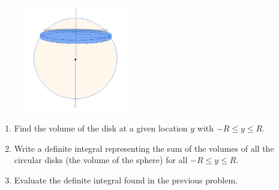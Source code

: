 \documentclass[12pt,letterpaper,fleqn]{article}
\begin{document}
\begin{enumerate}
\begin{figure}[!htb]
        \includegraphics[width=0.4\textwidth]{img/sphere_vol_by_disks.png}
       \end{figure}
       \begin{enumerate}
        \item Find the volume of the disk at a given location $y$ with $-R \leq y \leq R$.
        \item Write a definite integral representing the sum of the volumes of all the circular disks (the volume of the sphere) for all $-R \leq y \leq R$.
        \item Evaluate the definite integral found in the previous problem.
       \end{enumerate}
\end{enumerate}
\end{document}
